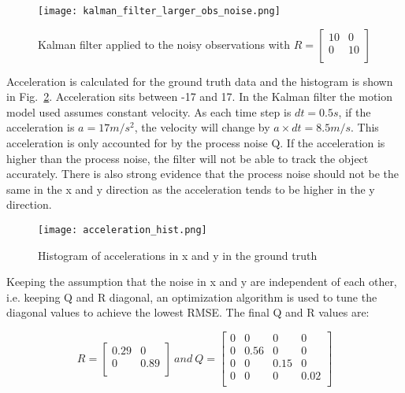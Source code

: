 \documentclass{report}
\begin{document}
\begin{figure}[ht]
    \centering
    \texttt{[image: kalman\_filter\_larger\_obs\_noise.png]}
    \caption{Kalman filter applied to the noisy observations with \(R = \begin{bmatrix} 
        10 & 0 \\
        0 & 10 \\
    \end{bmatrix}\)}
    \label{fig:kalman_filter_larger_obs_noise}
\end{figure}

Acceleration is calculated for the ground truth data and the histogram is shown in Fig.~\ref{fig:acceleration_hist}. Acceleration sits between -17 and 17. In the Kalman filter the motion model used assumes constant velocity. As each time step is \(dt=0.5s\), if the acceleration is \(a = 17 m/s^2\), the velocity will change by \(a \times dt = 8.5m/s\). This acceleration is only accounted for by the process noise Q. If the acceleration is higher than the process noise, the filter will not be able to track the object accurately. There is also strong evidence that the process noise should not be the same in the x and y direction as the acceleration tends to be higher in the y direction.

\begin{figure}[ht]
    \centering
    \texttt{[image: acceleration\_hist.png]}
    \caption{Histogram of accelerations in x and y in the ground truth}
    \label{fig:acceleration_hist}
\end{figure}

Keeping the assumption that the noise in x and y are independent of each other, i.e. keeping Q and R diagonal, an optimization algorithm is used to tune the diagonal values to achieve the lowest RMSE. The final Q and R values are:

\begin{equation}
R = \begin{bmatrix} 
    0.29 & 0    \\
    0    & 0.89 \\
\end{bmatrix}\ and\ Q = \begin{bmatrix} 
    0 & 0    & 0    & 0    \\
    0 & 0.56 & 0    & 0    \\
    0 & 0    & 0.15 & 0    \\
    0 & 0    & 0    & 0.02 \\
\end{bmatrix}
\end{equation}
\end{document}
